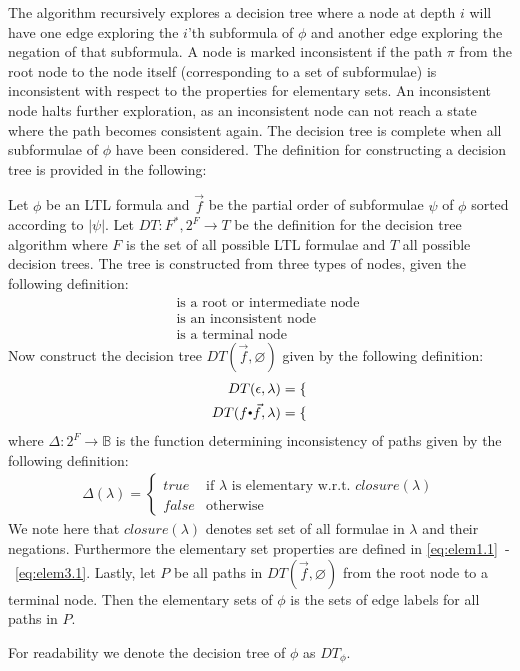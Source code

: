 The algorithm recursively explores a decision tree where a node at depth $i$ will have one edge exploring the $i$'th subformula of $\phi$ and another edge exploring the negation of that subformula. A node is marked inconsistent if the path $\pi$ from the root node to the node itself (corresponding to a set of subformulae) is inconsistent with respect to the properties for elementary sets. An inconsistent node halts further exploration, as an inconsistent node can not reach a state where the path becomes consistent again. The decision tree is complete when all subformulae of $\phi$ have been considered. The definition for constructing a decision tree is provided in the following:
\begin{definition}
Let $\phi$ be an LTL formula and $\vec{f}$ be the partial order of subformulae $\psi$ of $\phi$ sorted according to $|\psi|$. Let $DT: F^\ast, 2^F \rightarrow T$ be the definition for the decision tree algorithm where $F$ is the set of all possible LTL formulae and $T$ all possible decision trees. The tree is constructed from three types of nodes, given the following definition:
\begin{align*}
     &\text{ is a root or intermediate node} \\
      &\text{ is an inconsistent node} \\
     &\text{ is a terminal node}
\end{align*}
Now construct the decision tree $DT(\vec{f}, \varnothing)$ given by the following definition:
\begin{align*}
    DT(\epsilon, \lambda) &= 
        \begin{cases}
            
        \end{cases}
    \\
    DT(f \tcdot \vec{f}, \lambda) &= 
        \begin{cases}
        
        \end{cases}
\end{align*}
where $\Delta: 2^F \rightarrow \mathbb{B}$ is the function determining inconsistency of paths given by the following definition:
\begin{align*}
    \Delta(\lambda) =
    \begin{cases}
        true & \text{if $\lambda$ is elementary w.r.t. $closure(\lambda)$} \\
        false & \text{otherwise}
    \end{cases}
\end{align*}
We note here that $closure(\lambda)$ denotes set set of all formulae in $\lambda$ and their negations. Furthermore the elementary set properties are defined in \autoref{eq:elem1.1}~-~\autoref{eq:elem3.1}. Lastly, let $P$ be all paths in $DT(\vec{f}, \varnothing)$ from the root node to a terminal node. Then the elementary sets of $\phi$ is the sets of edge labels for all paths in $P$.

For readability we denote the decision tree of $\phi$ as $DT_\phi$.
\end{definition}

